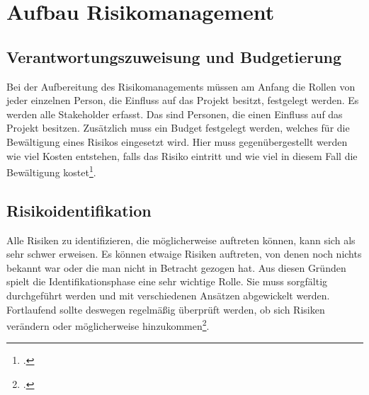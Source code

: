 \section{Aufbau Risikomanagement}
\subsection{Verantwortungszuweisung und Budgetierung}
Bei der Aufbereitung des Risikomanagements müssen am Anfang die Rollen von jeder einzelnen Person, die Einfluss auf das Projekt besitzt, festgelegt werden. Es werden alle Stakeholder erfasst. Das sind Personen, die einen Einfluss auf das Projekt besitzen.
Zusätzlich muss ein Budget festgelegt werden, welches für die Bewältigung eines Risikos eingesetzt wird. Hier muss gegenübergestellt werden wie viel Kosten entstehen, falls das Risiko eintritt und wie viel in diesem Fall die Bewältigung kostet\footcite{bva-risikomanagement}.

\subsection{Risikoidentifikation}
Alle Risiken zu identifizieren, die möglicherweise auftreten können, kann sich als sehr schwer erweisen. Es können etwaige Risiken auftreten, von denen noch nichts bekannt war oder die man nicht in Betracht gezogen hat. Aus diesen Gründen spielt die Identifikationsphase eine sehr wichtige Rolle. Sie muss sorgfältig durchgeführt werden und mit verschiedenen Ansätzen abgewickelt werden. Fortlaufend sollte deswegen regelmäßig überprüft werden, ob sich Risiken verändern oder möglicherweise hinzukommen\footcite{risikoidentifikation-definition}.

